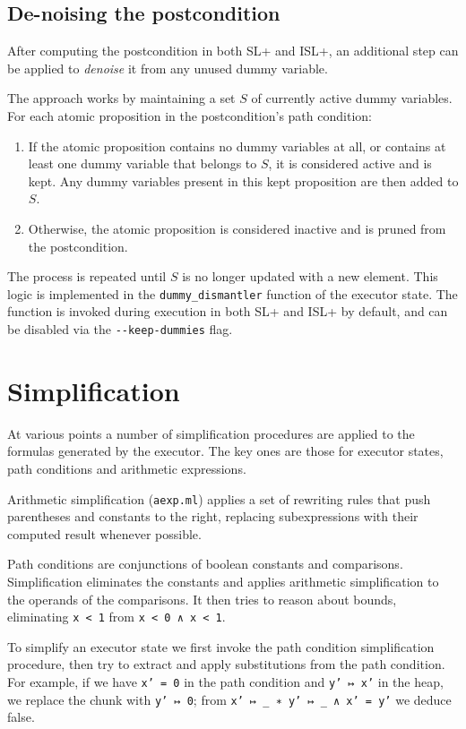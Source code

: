 \documentclass[parskip=half]{scrartcl}
\begin{document}
\subsection{De-noising the postcondition}
After computing the postcondition in both SL+ and ISL+, an additional step can be applied to \textit{denoise} it from any unused dummy variable.

The approach works by maintaining a set $S$ of currently active dummy variables. For each atomic proposition in the postcondition's path condition:
\begin{enumerate}
\item If the atomic proposition contains no dummy variables at all, or contains at least one dummy variable that belongs to $S$, it is considered active and is kept. Any dummy variables present in this kept proposition are then added to $S$.
\item Otherwise, the atomic proposition is considered inactive and is pruned from the postcondition.
\end{enumerate}
The process is repeated until $S$ is no longer updated with a new element.
This logic is implemented in the \texttt{dummy\_dismantler} function of the executor state. The function is invoked during execution in both SL+ and ISL+ by default, and can be disabled via the \verb|--keep-dummies| flag.

\section{Simplification}

At various points a number of simplification procedures are applied to the formulas generated by the executor. The key ones are those for executor states, path conditions and arithmetic expressions.

Arithmetic simplification (\texttt{aexp.ml}) applies a set of rewriting rules that push parentheses and constants to the right, replacing subexpressions with their computed result whenever possible.

Path conditions are conjunctions of boolean constants and comparisons. Simplification eliminates the constants and applies arithmetic simplification to the operands of the comparisons. It then tries to reason about bounds, \eg eliminating \texttt{x < 1} from \texttt{x < 0 ∧ x < 1}.

To simplify an executor state we first invoke the path condition simplification procedure, then try to extract and apply substitutions from the path condition. For example, if we have \texttt{x' = 0} in the path condition and \texttt{y' ↦ x'} in the heap, we replace the chunk with \texttt{y' ↦ 0}; from \texttt{x' ↦ \_ ∗ y' ↦ \_ ∧ x' = y'} we deduce false.
\end{document}
